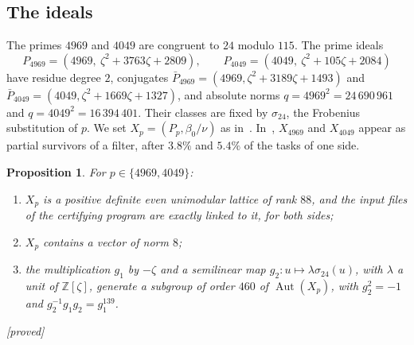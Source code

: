 \documentclass[11pt,a4paper]{amsart}
\theoremstyle{plain}
\newtheorem{proposition}{Proposition}[section]
\theoremstyle{definition}
\newcommand{\Z}{\mathbb{Z}}
\DeclareMathOperator{\Aut}{Aut}
\newcommand{\st}[1]{\textup{\textsf{\small[#1]}}}
\newcommand{\DEM}{\st{proved}}
\begin{document}
\subsection{The ideals}
The primes $4969$ and $4049$ are congruent to $24$ modulo $115$. The prime ideals
\[
P_{4969}=(4969,\ \zeta^2+3763\zeta+2809),\qquad P_{4049}=(4049,\ \zeta^2+105\zeta+2084)
\]
have residue degree $2$, conjugates $\bar P_{4969}=(4969,\zeta^2+3189\zeta+1493)$ and $\bar P_{4049}=(4049,\zeta^2+1669\zeta+1327)$, and absolute norms $q=4969^2=24\,690\,961$ and $q=4049^2=16\,394\,401$. Their classes are fixed by $\sigma_{24}$, the Frobenius substitution of $p$. We set $X_p=(P_p,\beta_0/\nu)$ as in~\cite[\S6]{Gau26}. In~\cite[\S6.3]{Gau26}, $X_{4969}$ and $X_{4049}$ appear as partial survivors of a filter, after $3.8\%$ and $5.4\%$ of the tasks of one side.

\begin{proposition}\label{prop:exact}
For $p\in\{4969,4049\}$:
\begin{enumerate}[label=\textup{(\arabic*)}]
\item $X_p$ is a positive definite even unimodular lattice of rank $88$, and the input files of the certifying program are exactly linked to it, for both sides;
\item $X_p$ contains a vector of norm $8$;
\item the multiplication $g_1$ by $-\zeta$ and a semilinear map $g_2\colon u\mapsto\lambda\sigma_{24}(u)$, with $\lambda$ a unit of $\Z[\zeta]$, generate a subgroup of order $460$ of $\Aut(X_p)$, with $g_2^2=-1$ and $g_2^{-1}g_1g_2=g_1^{139}$.
\end{enumerate}
\DEM
\end{proposition}
\end{document}
